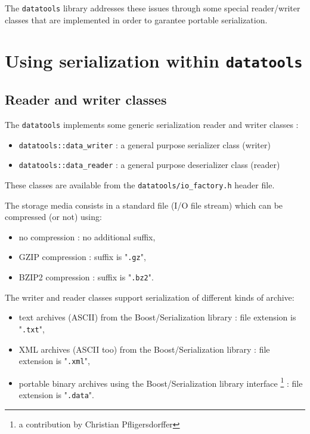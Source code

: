 \documentclass[a4paper,12pt]{article}
\newcommand{\pn}{\par\noindent}
\newcommand{\TT}[1]{"\texttt{#1}"}
\begin{document}
The \texttt{datatools} library addresses these issues through some
special reader/writer classes that  are implemented in order
to garantee portable serialization.


\section{Using serialization within  \texttt{datatools}}

\subsection{Reader and writer classes}

The  \texttt{datatools} implements  some generic  serialization reader
and writer classes :

\begin{itemize}

\item \texttt{datatools::data\_writer} : a general purpose serializer class (writer)

\item \texttt{datatools::data\_reader} : a general purpose deserializer class (reader)

\end{itemize}

\pn      These      classes      are      available      from      the
\texttt{datatools/io\_factory.h} header file.

\pn The  storage media consists in  a standard file  (I/O file stream)
which can be compressed (or not) using:

\begin{itemize}
\item no compression : no additional suffix,
\item GZIP compression : suffix is \TT{.gz},
\item BZIP2 compression : suffix is \TT{.bz2}.
\end{itemize}

\pn The  writer and reader classes support  serialization of different
kinds of archive:

\begin{itemize}

\item    text archives (ASCII) from the Boost/Serialization library : file extension is \TT{.txt},

\item    XML archives (ASCII too) from the Boost/Serialization library : file extension is \TT{.xml},

\item    portable binary archives using the Boost/Serialization library interface
\footnote{a contribution by Christian Pfligersdorffer} : file extension is \TT{.data}.

\end{itemize}
\end{document}
